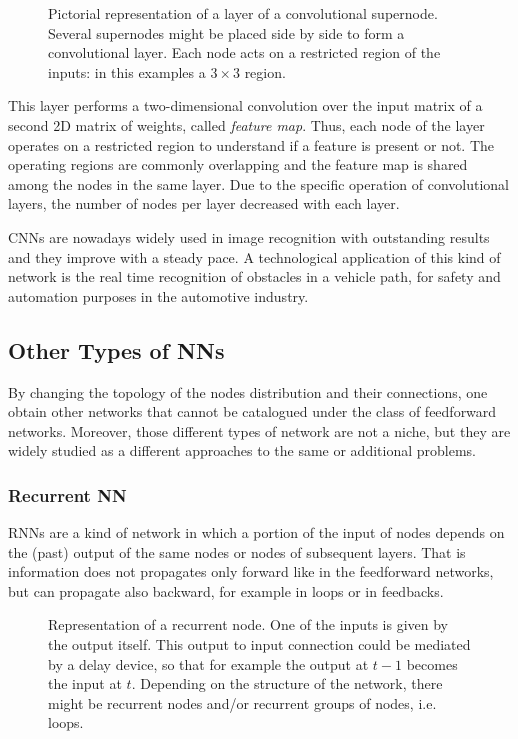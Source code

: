 \begin{figure}[ht]
	\centering
	
	\caption{%
		Pictorial representation of a layer of a convolutional supernode.
		Several supernodes might be placed side by side to form a convolutional layer.
		Each node acts on a restricted region of the inputs: in this examples a $3\times 3$ region.
		}
	\label{fig:convolutionalNN}
\end{figure}

This layer performs a two-dimensional convolution over the input matrix of a second 2D matrix of weights, called \textit{feature map}.
Thus, each node of the layer operates on a restricted region to understand if a feature is present or not.
The operating regions are commonly overlapping and the feature map is shared among the nodes in the same layer.
Due to the specific operation of convolutional layers, the number of nodes per layer decreased with each layer.

\aclp{CNN} are nowadays widely used in image recognition with outstanding results and they improve with a steady pace.
A technological application of this kind of network is the real time recognition of obstacles in a vehicle path, for safety and automation purposes in the automotive industry.

\subsection{Other Types of NNs}
\label{ssec:Other_Types_of_NNs}
By changing the topology of the nodes distribution and their connections, one obtain other networks that cannot be catalogued under the class of feedforward networks.
Moreover, those different types of network are not a niche, but they are widely studied as a different approaches to the same or additional problems.

\subsubsection{Recurrent NN}
\label{sssec:Recurrent_NN}
\acp{RNN} are a kind of network in which a portion of the input of nodes depends on the (past) output of the same nodes or nodes of subsequent layers.
That is information does not propagates only forward like in the feedforward networks, but can propagate also backward, for example in loops or in feedbacks.

\begin{figure}[ht]
	\centering
	
	\caption{%
		Representation of a recurrent node.
		One of the inputs is given by the output itself.
		This output to input connection could be mediated by a delay device, so that for example the output at $t-1$ becomes the input at $t$.
		Depending on the structure of the network, there might be recurrent nodes and/or recurrent groups of nodes, i.e. loops.
		}
	\label{fig:RecurrentNN}
\end{figure}

